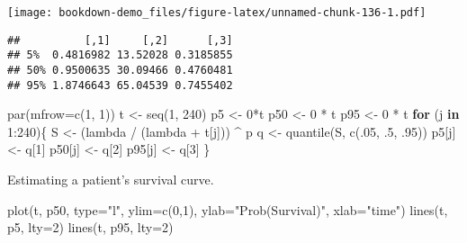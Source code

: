 \documentclass[
]{book}
\newenvironment{Shaded}{\begin{snugshade}}{\end{snugshade}}
\newcommand{\AttributeTok}[1]{\textcolor[rgb]{0.77,0.63,0.00}{#1}}
\newcommand{\ControlFlowTok}[1]{\textcolor[rgb]{0.13,0.29,0.53}{\textbf{#1}}}
\newcommand{\DecValTok}[1]{\textcolor[rgb]{0.00,0.00,0.81}{#1}}
\newcommand{\FunctionTok}[1]{\textcolor[rgb]{0.00,0.00,0.00}{#1}}
\newcommand{\NormalTok}[1]{#1}
\newcommand{\OtherTok}[1]{\textcolor[rgb]{0.56,0.35,0.01}{#1}}
\newcommand{\SpecialCharTok}[1]{\textcolor[rgb]{0.00,0.00,0.00}{#1}}
\newcommand{\StringTok}[1]{\textcolor[rgb]{0.31,0.60,0.02}{#1}}
\begin{document}
\texttt{[image: bookdown-demo\_files/figure-latex/unnamed-chunk-136-1.pdf]}

\begin{Shaded}
\end{Shaded}

\begin{verbatim}
##          [,1]     [,2]      [,3]
## 5%  0.4816982 13.52028 0.3185855
## 50% 0.9500635 30.09466 0.4760481
## 95% 1.8746643 65.04539 0.7455402
\end{verbatim}

\begin{Shaded}
\begin{Highlighting}[]
\FunctionTok{par}\NormalTok{(}\AttributeTok{mfrow=}\FunctionTok{c}\NormalTok{(}\DecValTok{1}\NormalTok{, }\DecValTok{1}\NormalTok{))}
\NormalTok{t }\OtherTok{\textless{}{-}} \FunctionTok{seq}\NormalTok{(}\DecValTok{1}\NormalTok{, }\DecValTok{240}\NormalTok{)}
\NormalTok{p5 }\OtherTok{\textless{}{-}} \DecValTok{0}\SpecialCharTok{*}\NormalTok{t}
\NormalTok{p50 }\OtherTok{\textless{}{-}} \DecValTok{0} \SpecialCharTok{*}\NormalTok{ t}
\NormalTok{p95 }\OtherTok{\textless{}{-}} \DecValTok{0} \SpecialCharTok{*}\NormalTok{ t}
\ControlFlowTok{for}\NormalTok{ (j }\ControlFlowTok{in} \DecValTok{1}\SpecialCharTok{:}\DecValTok{240}\NormalTok{)\{ }
\NormalTok{   S }\OtherTok{\textless{}{-}}\NormalTok{ (lambda }\SpecialCharTok{/}\NormalTok{ (lambda }\SpecialCharTok{+}\NormalTok{ t[j])) }\SpecialCharTok{\^{}}\NormalTok{ p}
\NormalTok{   q }\OtherTok{\textless{}{-}} \FunctionTok{quantile}\NormalTok{(S, }\FunctionTok{c}\NormalTok{(.}\DecValTok{05}\NormalTok{, .}\DecValTok{5}\NormalTok{, .}\DecValTok{95}\NormalTok{))}
\NormalTok{   p5[j] }\OtherTok{\textless{}{-}}\NormalTok{ q[}\DecValTok{1}\NormalTok{]}
\NormalTok{   p50[j] }\OtherTok{\textless{}{-}}\NormalTok{ q[}\DecValTok{2}\NormalTok{] }
\NormalTok{   p95[j] }\OtherTok{\textless{}{-}}\NormalTok{ q[}\DecValTok{3}\NormalTok{]}
\NormalTok{\}}
\end{Highlighting}
\end{Shaded}

Estimating a patient's survival curve.

\begin{Shaded}
\begin{Highlighting}[]
\FunctionTok{plot}\NormalTok{(t, p50, }\AttributeTok{type=}\StringTok{"l"}\NormalTok{, }
     \AttributeTok{ylim=}\FunctionTok{c}\NormalTok{(}\DecValTok{0}\NormalTok{,}\DecValTok{1}\NormalTok{), }
     \AttributeTok{ylab=}\StringTok{"Prob(Survival)"}\NormalTok{,}
     \AttributeTok{xlab=}\StringTok{"time"}\NormalTok{)}
 \FunctionTok{lines}\NormalTok{(t, p5, }\AttributeTok{lty=}\DecValTok{2}\NormalTok{)}
 \FunctionTok{lines}\NormalTok{(t, p95, }\AttributeTok{lty=}\DecValTok{2}\NormalTok{)}
\end{Highlighting}
\end{Shaded}
\end{document}
